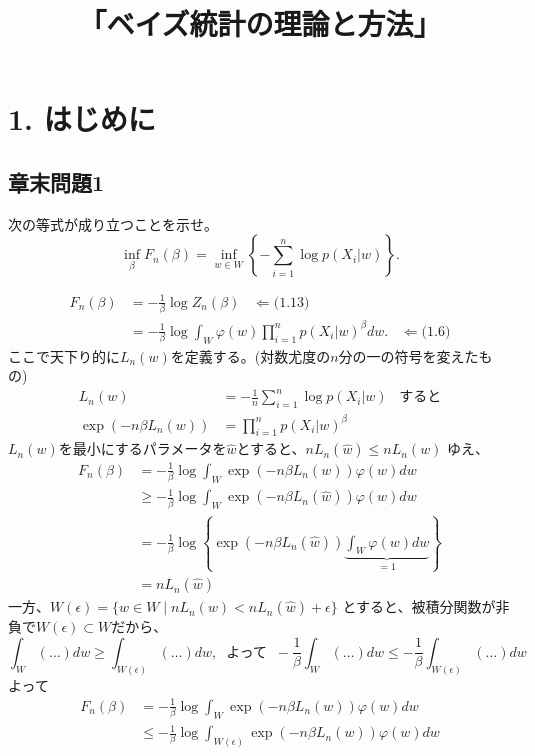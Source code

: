 \documentclass[dvipdfmx,11pt]{jsarticle}
\title{「ベイズ統計の理論と方法」}
\begin{document}
\maketitle

\section*{1. はじめに}
\subsection*{章末問題1}
次の等式が成り立つことを示せ。
$$\inf_\beta F_n(\beta) = \inf_{w\in W} \left\{-\sum_{i=1}^n \log p(X_i|w)\right\}.$$

\begin{align*}
F_n(\beta) &= -\frac1\beta \log Z_n(\beta) \;\;\; \Leftarrow \text{(1.13)}\\
&= -\frac1\beta \log \int_W \varphi(w) \prod_{i=1}^n p(X_i|w)^\beta dw. \;\;\; \Leftarrow \text{(1.6)}
\end{align*}
ここで天下り的に$L_n(w)$を定義する。(対数尤度の$n$分の一の符号を変えたもの)
\begin{align*}
L_n(w) &= -\frac1n \sum_{i=1}^n \log p(X_i|w) \;\;\; \text{すると}\\
\exp\left(-n\beta L_n(w)\right) &= \prod_{i=1}^n p(X_i|w)^\beta
\end{align*}
$L_n(w)$を最小にするパラメータを$\hat{w}$とすると、$nL_n(\hat{w}) \leq nL_n(w)$ ゆえ、
\begin{align*}
F_n(\beta) &= -\frac1\beta \log \int_W \exp\left(-n\beta L_n(w)\right)\varphi(w) dw \\
&\geq -\frac1\beta \log \int_W \exp\left(-n\beta L_n(\hat{w})\right)\varphi(w) dw \\
&= -\frac1\beta \log \left\{ \exp\left(-n\beta L_n(\hat{w})\right) \underbrace{\int_W \varphi(w) dw}_{=1}\right\} \\
&= nL_n(\hat{w})
\end{align*}
一方、$W(\epsilon) = \{w\in W \;|\; nL_n(w) < nL_n(\hat{w}) + \epsilon\}$ とすると、被積分関数が非負で$W(\epsilon)\subset W$だから、
$$\int_W (\dots) dw \geq \int_{W(\epsilon)} (\dots) dw, \;\; \text{よって} \;\; -\frac1\beta\int_W (\dots) dw \leq -\frac1\beta\int_{W(\epsilon)} (\dots) dw$$
よって
\begin{align*}
F_n(\beta) &= -\frac1\beta \log \int_W \exp\left(-n\beta L_n(w)\right)\varphi(w) dw \\
&\leq -\frac1\beta \log \int_{W(\epsilon)} \exp\left(-n\beta L_n(w)\right)\varphi(w) dw \\
\end{align*}
\end{document}
